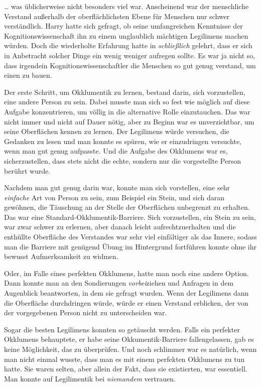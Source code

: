 {… was üblicherweise nicht besonders viel war. Anscheinend war der menschliche Verstand außerhalb der oberflächlichsten Ebene für Menschen nur schwer verständlich. Harry hatte sich gefragt, ob seine umfangreichen Kenntnisse der Kognitionswissenschaft ihn zu einem unglaublich mächtigen Legilimens machen würden. Doch die wiederholte Erfahrung hatte in \emph{schließlich} gelehrt, dass er sich in Anbetracht solcher Dinge ein wenig weniger aufregen sollte. Es war ja nicht so, dass irgendein Kognitionswissenschaftler die Menschen so gut genug verstand, um einen zu bauen.

Der erste Schritt, um Okklumentik zu lernen, bestand darin, sich vorzustellen, eine andere Person zu sein. Dabei musste man sich so fest wie möglich auf diese Aufgabe konzentrieren, um völlig in die alternative Rolle einzutauchen. Das war nicht immer und nicht auf Dauer nötig, aber zu Beginn war es unverzichtbar, um seine Oberflächen kennen zu lernen. Der Legilimens würde versuchen, die Gedanken zu lesen und man konnte es spüren, wie er einzudringen versuchte, wenn man gut genug aufpasste. Und die Aufgabe des Okklumens war es, sicherzustellen, dass stets nicht die echte, sondern nur die vorgestellte Person berührt wurde.

Nachdem man gut genug darin war, konnte man sich vorstellen, eine sehr \emph{einfache} Art von Person zu sein, zum Beispiel ein Stein, und sich daran gewöhnen, die Täuschung an der Stelle der Oberflächen unbegrenzt zu erhalten. Das war eine Standard-Okklumentik-Barriere. Sich vorzustellen, ein Stein zu sein, war zwar schwer zu erlernen, aber danach leicht aufrechtzuerhalten und die enthüllte Oberfläche des Verstandes war sehr viel einfältiger als das Innere, sodass man die Barriere mit genügend Übung im Hintergrund fortführen konnte ohne ihr bewusst Aufmerksamkeit zu widmen.

Oder, im Falle eines perfekten Okklumens, hatte man noch eine andere Option. Dann konnte man an den Sondierungen \emph{vorbei}ziehen und Anfragen in dem Augenblick beantworten, in dem sie gefragt wurden. Wenn der Legilimens dann die Oberfläche durchdringen würde, würde er einen Verstand erblicken, der von der vorgegebenen Person nicht zu unterscheiden war.

Sogar die besten Legilimens konnten so getäuscht werden. Falls ein perfekter Okklumens behauptete, er habe seine Okkumentik-Barriere fallengelassen, gab es keine Möglichkeit, das zu überprüfen. Und noch schlimmer war es natürlich, wenn man nicht einmal wusste, dass man es mit einem perfekten Okklumens zu tun hatte. Sie waren selten, aber allein der Fakt, dass sie existierten, war essentiell. Man konnte auf Legilimentik bei \emph{niemandem} vertrauen.

}
